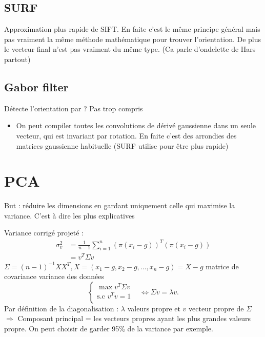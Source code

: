 \documentclass{article}
\theoremstyle{plain}%
\theoremstyle{definition}
\theoremstyle{remark}
\begin{document}
\subsection{SURF}
Approximation plus rapide de SIFT. En faite c'est le même principe général mais pas vraiment la même méthode mathématique pour trouver l'orientation. De plus le vecteur final n'est pas vraiment du même type. (Ca parle d'ondelette de Hars partout)

\subsection{Gabor filter}
Détecte l'orientation par ? Pas trop compris
\begin{itemize}
    \item On peut compiler toutes les convolutions de dérivé gaussienne dans un seule vecteur, qui est invariant par rotation. En faite c'est des arrondies des matrices gaussienne habituelle (SURF utilise pour être plus rapide)
\end{itemize}

\section{PCA}
But : réduire les dimensions en gardant uniquement celle qui maximise la variance. C'est à dire les plus explicatives 

Variance corrigé projeté : \begin{align*}
    \sigma _v^2 &= \frac{1}{n-1}\sum_{i=1}^{n}(\pi (x_i - g))^T (\pi (x_i - g)) \\
    &= v^T \Sigma v
\end{align*}
$ \Sigma = (n-1)^{-1} X X^T, X = (x_1 - g, x_2 - g, \dots, x_n - g) = X - g$ matrice de covariance variance des données
\[
    \begin{cases}
    \max v^T \Sigma v &\text{}\\
    \text{s.c } v^T v = 1\\
    \end{cases} \Leftrightarrow \Sigma v = \lambda v
.\]
Par définition de la diagonalisation : $ \lambda $ valeurs propre et $ v $ vecteur propre de $ \Sigma  $ \\
$\Rightarrow $ Composant principal = les vecteurs propres ayant les plus grandes valeurs propre. On peut choisir de garder 95\% de la variance par exemple.
\end{document}
